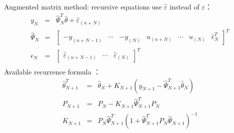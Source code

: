 \begin{frame}{ Augmented matrix method: recursive equations }
use $\hat\varepsilon$ instead of $\varepsilon$：
\begin{eqnarray*}
y_{N} &=& \hat \Psi_N^T\hat\theta +\hat\varepsilon_{(n+N)} \\
\hat\Psi_N &=&\begin{bmatrix}-y_{(n+N-1)} & \cdots & -y_{(N)} & u_{(n+N)} &\cdots & u_{(N)} & \hat\epsilon_N^T \end{bmatrix}^T \\
\hat\epsilon_N &=&\begin{bmatrix} \hat\varepsilon_{(n+N-1)} & \cdots & \hat\varepsilon_{(N)} \end{bmatrix}^T \\
\end{eqnarray*}
 Available recurrence formula ：
\begin{eqnarray*}
\hat\theta_{N+1}^T &=& \hat\theta_N + K_{N+1} (y_{N+1}-\hat\Psi_{N+1}^T\hat\theta_N) \\
P_{N+1} &=& P_N -K_{N+1}\hat\Psi_{N+1}^T P_N \\
K_{N+1} &=& P_N \hat\Psi_{N+1}^T (1+\hat\Psi_{N+1}^T P_N \hat\Psi_{N+1})^{-1}
\end{eqnarray*}
\end{frame}



